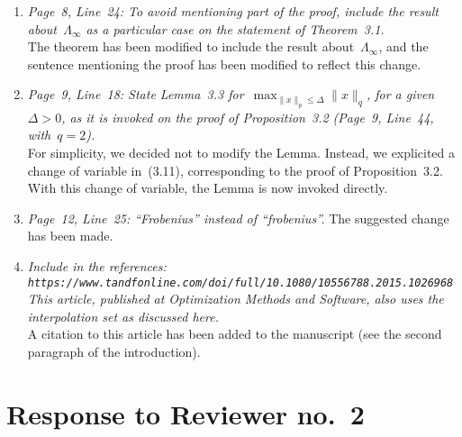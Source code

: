 \documentclass{article}
\begin{document}
\begin{enumerate}
    \item \textit{Page~8, Line~24: To avoid mentioning part of the proof, include the result about~$\Lambda_{\infty}$ as a particular case on the statement of Theorem~3.1.}\\
    The theorem has been modified to include the result about~$\Lambda_{\infty}$, and the sentence mentioning the proof has been modified to reflect this change.
    \item \textit{Page~9, Line~18: State Lemma~3.3 for~$\max_{\lVert x \rVert_p \le \Delta} \lVert x \rVert_q$, for a given~$\Delta > 0$, as it is invoked on the proof of Proposition~3.2 (Page~9, Line~44, with~$q = 2$).}\\
    For simplicity, we decided not to modify the Lemma.
    Instead, we explicited a change of variable in~(3.11), corresponding to the proof of Proposition~3.2.
    With this change of variable, the Lemma is now invoked directly.
    \item \textit{Page~12, Line~25: ``Frobenius'' instead of ``frobenius''.}
    The suggested change has been made.
    \item \textit{Include in the references:\\ \texttt{https://www.tandfonline.com/doi/full/10.1080/10556788.2015.1026968}\\ This article, published at Optimization Methods and Software, also uses the interpolation set as discussed here.}\\
    A citation to this article has been added to the manuscript (see the second paragraph of the introduction).
\end{enumerate}

\section{Response to Reviewer no.\ 2}
\end{document}

